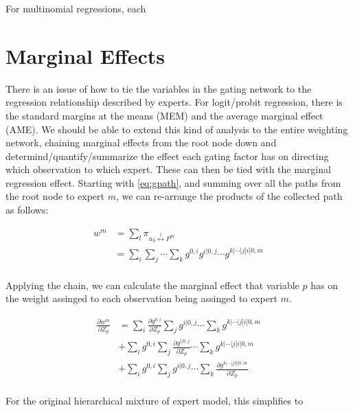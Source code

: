 \documentclass[12pt]{article}
\begin{document}
For multinomial regressions, each 



\section{Marginal Effects} \label{sec:MarginalEffects}
There is an issue of how to tie the variables in the gating network to the regression
relationship described by experts. For logit/probit regression, there is the
standard margins at the means (MEM) and the average marginal effect (AME). We should
be able to extend this kind of analysis to the entire weighting network, chaining
marginal effects from the root node down and determind/quantify/summarize the effect
each gating factor has on directing which observation to which expert. These can
then be tied with the marginal regression effect. Starting with \ref{eq:gpath},
and summing over all the paths from the root node to expert $m$, we can re-arrange
the products of the collected path as follows:  

\begin{equation}
  \begin{split}
  w^{m} &= \sum_{l} \pi_{n_{0} \overset{l}{\longleftrightarrow} P^{m}} \\
        &= \sum_{i} \sum_{j} \cdots \sum_{k} g^{0, i} g^{i|0, j} \cdots g^{k|\cdots|j|i|0, m} \\
  \end{split}
\end{equation}

Applying the chain, we can calculate the marginal effect that variable $p$ has on
the weight assinged to each observation being assinged to expert $m$.

\begin{equation}
  \begin{split}
    \frac{\partial w^{m}}{\partial Z_{p}} &= \sum_{i} \frac{\partial g^{0, i}}{\partial Z_{p}} \sum_{j} g^{i|0, j} \cdots \sum_{k} g^{k|\cdots|j|i|0, m} \\
    &+ \sum_{i} g^{0, i} \sum_{j} \frac{\partial g^{i|0, j}}{\partial Z_{p}} \cdots \sum_{k} g^{k|\cdots|j|i|0, m} \\
    &+ \sum_{i} g^{0, i} \sum_{j} g^{i|0, j} \cdots \sum_{k} \frac{\partial g^{k|\cdots|j|i|0, m}}{\partial Z_{p}} \\
  \end{split}
\end{equation}

For the original hierarchical mixture of expert model, this simplifies to
\end{document}
